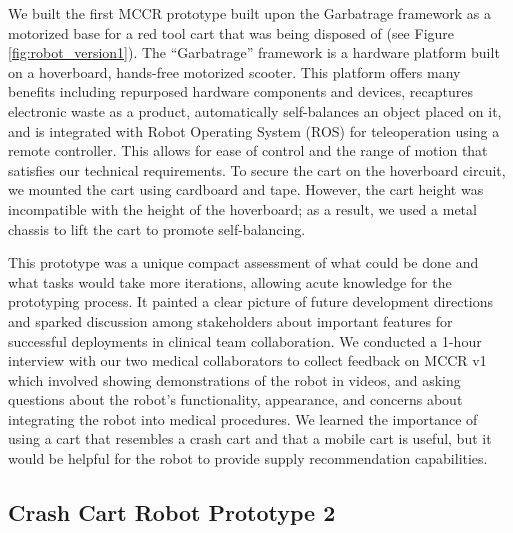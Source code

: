 We built the first MCCR prototype built upon the Garbatrage framework \cite{mandel2023recapturing} as a motorized base for a red tool cart that was being disposed of (see Figure \ref{fig:robot_version1}). 
The “Garbatrage” framework is a hardware platform built on a hoverboard, hands-free motorized scooter.
This platform offers many benefits including repurposed hardware components and devices, recaptures electronic waste as a product, automatically self-balances an object placed on it, and is integrated with Robot Operating System (ROS) for teleoperation using a remote controller.
This allows for ease of control and the range of motion that satisfies our technical requirements. 
To secure the cart on the hoverboard circuit, we mounted the cart using cardboard and tape.%
However, the cart height was incompatible with the height of the hoverboard; as a result, we used a metal chassis to lift the cart to promote self-balancing.


This prototype was a unique compact assessment of what could be done and what tasks would take more iterations, allowing acute knowledge for the prototyping process. 
It painted a clear picture of future development directions and sparked discussion among stakeholders about important features for successful deployments in clinical team collaboration. %
We conducted a 1-hour interview with our two medical collaborators to collect feedback on MCCR v1 which involved showing demonstrations of the robot in videos, and asking questions about the robot’s functionality, appearance, and concerns about integrating the robot into medical procedures.
We learned the importance of using a cart that resembles a crash cart and that a mobile cart is useful, but it would be helpful for the robot to provide supply recommendation capabilities.










\subsection{Crash Cart Robot Prototype 2}

